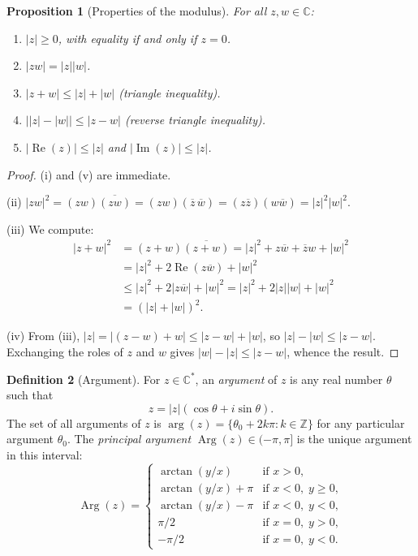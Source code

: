 \documentclass[12pt,a4paper,openany]{book}
\theoremstyle{definition}
\newtheorem{definition}{Definition}[chapter]
\theoremstyle{plain}
\newtheorem{proposition}[definition]{Proposition}
\theoremstyle{remark}
\newcommand{\C}{\mathbb{C}}
\newcommand{\Z}{\mathbb{Z}}
\DeclareMathOperator{\re}{Re}
\DeclareMathOperator{\im}{Im}
\DeclareMathOperator{\Arg}{Arg}
\newcommand{\abs}[1]{\left|#1\right|}
\newcommand{\conj}[1]{\overline{#1}}
\begin{document}
\begin{proposition}[Properties of the modulus]
\label{prop:modulus-props}
For all $z,w\in\C$:
\begin{enumerate}[label=\textup{(\roman*)}]
  \item $\abs{z}\geq 0$, with equality if and only if $z=0$.
  \item $\abs{zw} = \abs{z}\abs{w}$.
  \item $\abs{z+w}\leq\abs{z}+\abs{w}$ \textup{(triangle inequality)}.
  \item $\bigl|\abs{z}-\abs{w}\bigr| \leq \abs{z-w}$ \textup{(reverse triangle inequality)}.
  \item $\abs{\re(z)}\leq\abs{z}$ and $\abs{\im(z)}\leq\abs{z}$.
\end{enumerate}
\end{proposition}

\begin{proof}
(i) and (v) are immediate.

(ii) $\abs{zw}^2 = (zw)\conj{(zw)} = (zw)(\conj{z}\,\conj{w}) = (z\conj{z})(w\conj{w}) = \abs{z}^2\abs{w}^2$.

(iii) We compute:
\begin{align*}
\abs{z+w}^2 &= (z+w)\conj{(z+w)} = \abs{z}^2 + z\conj{w} + \conj{z}w + \abs{w}^2 \\
             &= \abs{z}^2 + 2\re(z\conj{w}) + \abs{w}^2 \\
             &\leq \abs{z}^2 + 2\abs{z\conj{w}} + \abs{w}^2 = \abs{z}^2 + 2\abs{z}\abs{w} + \abs{w}^2 \\
             &= (\abs{z}+\abs{w})^2.
\end{align*}

(iv) From (iii), $\abs{z} = \abs{(z-w)+w}\leq\abs{z-w}+\abs{w}$, so $\abs{z}-\abs{w}\leq\abs{z-w}$. Exchanging the roles of $z$ and $w$ gives $\abs{w}-\abs{z}\leq\abs{z-w}$, whence the result.
\end{proof}

\begin{definition}[Argument]
\label{def:argument}
For $z\in\C^*$, an \emph{argument} of $z$ is any real number $\theta$ such that
\[
  z = \abs{z}(\cos\theta + i\sin\theta).
\]
The set of all arguments of $z$ is $\arg(z) = \{\theta_0 + 2k\pi : k\in\Z\}$ for any particular argument $\theta_0$. The \emph{principal argument} $\Arg(z)\in(-\pi,\pi]$ is the unique argument in this interval:
\[
  \Arg(z) = \begin{cases}
    \arctan(y/x) & \text{if } x > 0,\\
    \arctan(y/x)+\pi & \text{if } x < 0,\; y \geq 0,\\
    \arctan(y/x)-\pi & \text{if } x < 0,\; y < 0,\\
    \pi/2 & \text{if } x = 0,\; y > 0,\\
    -\pi/2 & \text{if } x = 0,\; y < 0.
  \end{cases}
\]
\end{definition}
\end{document}
